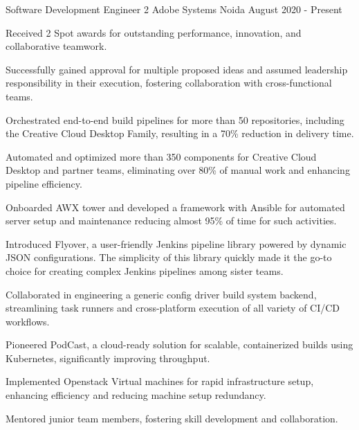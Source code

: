 

\begin{cventries}

\cventry
    {Software Development Engineer 2} %
    {Adobe Systems} %
    {Noida} %
    {August 2020 - Present} %
    {
    \begin{cvitems}
        \item Received 2 Spot awards for outstanding performance, innovation, and collaborative teamwork.
        \item Successfully gained approval for multiple proposed ideas and assumed leadership responsibility in their execution, fostering collaboration with cross-functional teams.
        \item Orchestrated end-to-end build pipelines for more than 50 repositories, including the Creative Cloud Desktop Family, resulting in a 70\% reduction in delivery time.
        \item Automated and optimized more than 350 components for Creative Cloud Desktop and partner teams, eliminating over 80\% of manual work and enhancing pipeline efficiency.
        \item Onboarded AWX tower and developed a framework with Ansible for automated server setup and maintenance reducing almost 95\% of time for such activities.
        \item Introduced Flyover, a user-friendly Jenkins pipeline library powered by dynamic JSON configurations. The simplicity of this library quickly made it the go-to choice for creating complex Jenkins pipelines among sister teams.
        \item Collaborated in engineering a generic config driver build system backend, streamlining task runners and cross-platform execution of all variety of CI/CD workflows.
        \item Pioneered PodCast, a cloud-ready solution for scalable, containerized builds using Kubernetes, significantly improving throughput.
        \item Implemented Openstack Virtual machines for rapid infrastructure setup, enhancing efficiency and reducing machine setup redundancy.
        \item Mentored junior team members, fostering skill development and collaboration.
    \end{cvitems}
    }


\end{cventries}
